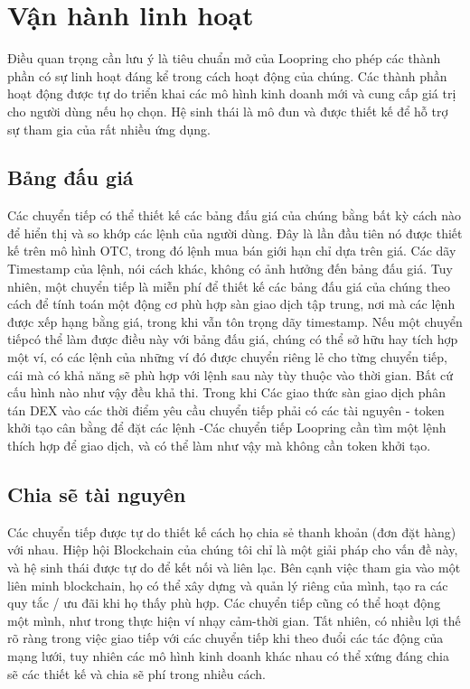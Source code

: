 \documentclass[12pt,a4paper]{article}
\begin{document}
\begin{multicols}{2}
\begin{enumerate}[topsep=-5pt,itemsep=1ex,partopsep=5ex,parsep=1ex]
\end{enumerate}

\section{Vận hành linh hoạt\label{sec:business_model}}
Điều quan trọng cần lưu ý là tiêu chuẩn mở của Loopring cho phép các thành phần có sự linh hoạt đáng kể trong cách hoạt động của chúng. Các thành phần hoạt động được tự do triển khai các mô hình kinh doanh mới và cung cấp giá trị cho người dùng nếu họ chọn. Hệ sinh thái là mô đun và được thiết kế để hỗ trợ sự tham gia của rất nhiều ứng dụng.

\subsection{Bảng đấu giá\label{sec:order_book}}
Các chuyển tiếp có thể thiết kế các bảng đấu giá của chúng bằng bất kỳ cách nào để hiển thị và so khớp các lệnh của người dùng. Đây là lần đầu tiên nó được thiết kế trên mô hình OTC, trong đó lệnh mua bán giới hạn chỉ dựa trên giá. Các dãy Timestamp của lệnh, nói cách khác, không có ảnh hưởng đến bảng đấu giá. Tuy nhiên, một chuyển tiếp là miễn phí để thiết kế các bảng đấu giá của chúng theo cách để tính toán một động cơ phù hợp sàn giao dịch tập trung, nơi mà các lệnh được xếp hạng bằng giá, trong khi vẫn tôn trọng dãy timestamp. Nếu một chuyển tiếpcó thể làm được điều này với bảng đấu giá, chúng có thể sở hữu hay tích hợp một ví, có các lệnh của những ví đó được chuyển riêng lẻ cho từng chuyển tiếp, cái mà có khả năng sẽ phù hợp với lệnh sau này tùy thuộc vào thời gian. Bất cứ cấu hình nào như vậy đều khả thi.
Trong khi Các giao thức sàn giao dịch phân tán DEX vào các thời điểm yêu cầu chuyển tiếp phải có các tài nguyên - token khởi tạo cân bằng để đặt các lệnh -Các chuyển tiếp Loopring cần tìm một lệnh thích hợp để giao dịch, và có thể làm như vậy mà không cần token khởi tạo.

\subsection{Chia sẽ tài nguyên\label{sec:liquidity_sharing}}
Các chuyển tiếp được tự do thiết kế cách họ chia sẻ thanh khoản (đơn đặt hàng) với nhau. Hiệp hội Blockchain của chúng tôi chỉ là một giải pháp cho vấn đề này, và hệ sinh thái được tự do để kết nối và liên lạc. Bên cạnh việc tham gia vào một liên minh blockchain, họ có thể xây dựng và quản lý riêng của mình, tạo ra các quy tắc / ưu đãi khi họ thấy phù hợp. Các chuyển tiếp cũng có thể hoạt động một mình, như trong thực hiện ví nhạy cảm-thời gian. Tất nhiên, có nhiều lợi thế rõ ràng trong việc giao tiếp với các chuyển tiếp khi theo đuổi các tác động của mạng lưới, tuy nhiên các mô hình kinh doanh khác nhau có thể xứng đáng chia sẽ các thiết kế và chia sẽ phí trong nhiều cách.


\end{multicols}
\end{document}
